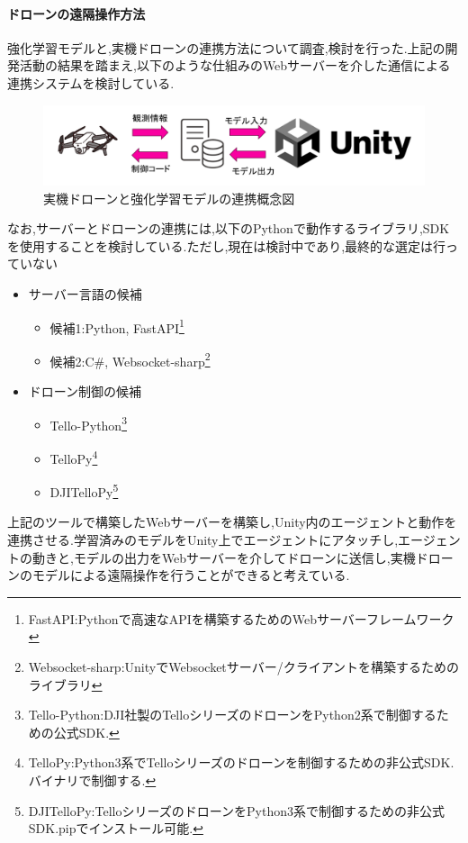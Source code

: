 \documentclass{article}[jsarticle]
\begin{document}
\paragraph{ドローンの遠隔操作方法}
強化学習モデルと,実機ドローンの連携方法について調査,検討を行った.上記の開発活動の結果を踏まえ,以下のような仕組みのWebサーバーを介した通信による連携システムを検討している.
\begin{figure}[H]
    \centering
    \includegraphics[width=\textwidth]{./Images/20240203211650.png}
    \captionsetup{justification=centering}
    \caption{実機ドローンと強化学習モデルの連携概念図}
\end{figure}
なお,サーバーとドローンの連携には,以下のPythonで動作するライブラリ,SDKを使用することを検討している.ただし,現在は検討中であり,最終的な選定は行っていない
\begin{itemize}
    \item サーバー言語の候補
    \begin{itemize}
        \item 候補1:Python, FastAPI\footnote{FastAPI:Pythonで高速なAPIを構築するためのWebサーバーフレームワーク}
        \item 候補2:C\#, Websocket-sharp\footnote{Websocket-sharp:UnityでWebsocketサーバー/クライアントを構築するためのライブラリ}
    \end{itemize}
    \item ドローン制御の候補
    \begin{itemize}
        \item Tello-Python\footnote{Tello-Python:DJI社製のTelloシリーズのドローンをPython2系で制御するための公式SDK.}
        \item TelloPy\footnote{TelloPy:Python3系でTelloシリーズのドローンを制御するための非公式SDK.バイナリで制御する.}
        \item DJITelloPy\footnote{DJITelloPy:TelloシリーズのドローンをPython3系で制御するための非公式SDK.pipでインストール可能.}
    \end{itemize}
\end{itemize}
上記のツールで構築したWebサーバーを構築し,Unity内のエージェントと動作を連携させる.学習済みのモデルをUnity上でエージェントにアタッチし,エージェントの動きと,モデルの出力をWebサーバーを介してドローンに送信し,実機ドローンのモデルによる遠隔操作を行うことができると考えている.
\end{document}
